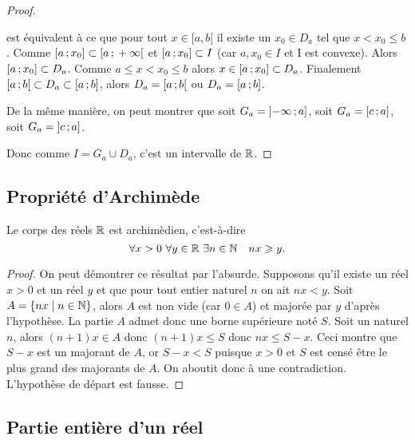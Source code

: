 \begin{proof}
\begin{itemize}
\begin{itemize}
          est équivalent à ce que pour tout \(x\in[a, b[\) il existe un \(x_0\in
          D_a\) tel que \(x<x_0 \leqslant b\). Comme
          \(\left[ a \, ; {} x_0 \right]\subset \left[ a \, ; {}  + \infty \right[\) et
          \(\left[ a \, ; {} x_0 \right]\subset I\) (car \(a, x_0 \in I\) et I est
          convexe). Alors \(\left[ a \, ; {} x_0 \right] \subset D_a\). Comme
          \(a\leqslant x < x_0\leqslant b\) alors \(x\in
          \left[ a \, ; {} x_0 \right]\subset D_a\). Finalement
          \(\left[ a \, ; {} b \right[\subset D_a \subset \left[ a \, ; {} b \right]\), alors
          \(D_a = \left[ a \, ; {} b \right[\) ou \(D_a = \left[ a \, ; {} b \right]\).
      \end{itemize}
      De la même manière, on peut montrer que soit \(G_a = \left]  -
      \infty \, ; {} a \right]\), soit \(G_a = \left[ c \, ; {} a \right]\), soit \(G_a =
      \left] c \, ; {} a \right]\).
  \end{itemize}
  Donc comme \(I = G_a\cup D_a\), c'est un intervalle de \(\mathbb{R}\).
\end{proof}

\subsection{Propriété d'Archimède}
\begin{prop}
  Le corps des réels \(\mathbb{R}\) est archimèdien, c'est-à-dire
  \begin{equation}
    \forall x>0 \ \forall y\in \R \ \exists n\in \N \quad nx\geqslant y.
  \end{equation}
\end{prop}
\begin{proof}
  On peut démontrer ce résultat par l'absurde. Supposons qu'il existe un réel
  \(x>0\) et un réel \(y\) et que pour tout entier naturel \(n\) on ait
  \(nx<y\). Soit \(A = \left\{nx\mathrel{}\middle|\mathrel{}n\in \mathbb{N}\right\}\), alors \(A\) est non vide (car
  \(0\in A\)) et majorée par \(y\) d'après l'hypothèse. La partie \(A\) admet
  donc une borne supérieure noté \(S\). Soit un naturel \(n\), alors \((n + 1)x
  \in A\) donc \((n + 1)x\leqslant S\) donc \(nx \leqslant S - x\). Ceci montre
  que \(S - x\) est un majorant de \(A\), or \(S - x<S\) puisque \(x>0\) et
  \(S\) est censé être le plus grand des majorants de \(A\). On aboutit donc à
  une contradiction.  L'hypothèse de départ est fausse.
\end{proof}

\subsection{Partie entière d'un réel}

